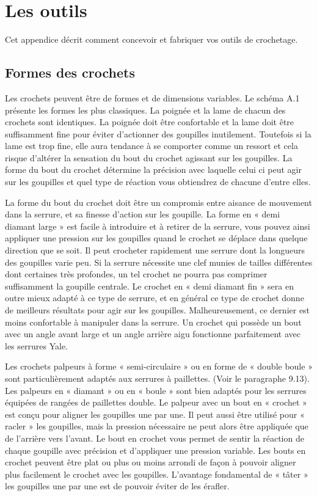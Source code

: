 \documentclass[a4paper,french,11pt,twoside]{report}
\begin{document}
\section{Les outils}

Cet appendice décrit comment concevoir et fabriquer vos outils de crochetage.

\subsection{Formes des crochets}

Les crochets peuvent être de formes et de dimensions variables. Le schéma A.1 présente les formes les plus classiques. La poignée et la lame de chacun des crochets sont identiques. La poignée doit être confortable et la lame doit être suffisamment fine pour éviter d'actionner des goupilles inutilement. Toutefois si la lame est trop fine, elle aura tendance à se comporter comme un ressort et cela risque d'altérer la sensation du bout du crochet agissant sur les goupilles. La forme du bout du crochet détermine la précision avec laquelle celui ci peut agir sur les goupilles et quel type de réaction vous obtiendrez de chacune d'entre elles.

La forme du bout du crochet doit être un compromis entre aisance de mouvement dans la serrure, et sa finesse d'action sur les goupille. La forme en « demi diamant large » est facile à introduire et à retirer de la serrure, vous pouvez ainsi appliquer une pression sur les goupilles quand le crochet se déplace dans quelque direction que se soit. Il peut crocheter rapidement une serrure dont la longueurs des goupilles varie peu. Si la serrure nécessite une clef munies de tailles différentes dont certaines très profondes, un tel crochet ne pourra pas comprimer suffisamment la goupille centrale. Le crochet en « demi diamant fin » sera en outre mieux adapté à ce type de serrure, et en général ce type de crochet donne de meilleurs résultats pour agir sur les goupilles. Malheureusement, ce dernier est moins confortable à manipuler dans la serrure. Un crochet qui possède un bout avec un angle avant large et un angle arrière aigu fonctionne parfaitement avec les serrures Yale.

Les crochets palpeurs à forme « semi-circulaire » ou en forme de « double boule » sont particulièrement adaptés aux serrures à paillettes. (Voir le paragraphe 9.13). Les palpeurs en « diamant » ou en « boule » sont bien adaptés pour les serrures équipées de rangées de paillettes double. Le palpeur avec un bout en « crochet » est conçu pour aligner les goupilles une par une. Il peut aussi être utilisé pour « racler » les goupilles, mais la pression nécessaire ne peut alors être appliquée que de l'arrière vers l'avant. Le bout en crochet vous permet de sentir la réaction de chaque goupille avec précision et d'appliquer une pression variable. Les bouts en crochet peuvent être plat ou plus ou moins arrondi de façon à pouvoir aligner plus facilement le crochet avec les goupilles. L'avantage fondamental de « tâter » les goupilles une par une est de pouvoir éviter de les érafler.
\end{document}
